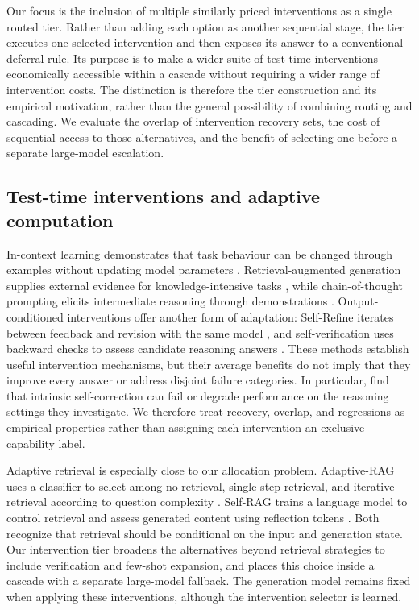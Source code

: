 \documentclass[sigconf]{acmart}
\begin{document}
Our focus is the inclusion of multiple similarly priced interventions as a single routed tier. Rather than adding each option as another sequential stage, the tier executes one selected intervention and then exposes its answer to a conventional deferral rule. Its purpose is to make a wider suite of test-time interventions economically accessible within a cascade without requiring a wider range of intervention costs. The distinction is therefore the tier construction and its empirical motivation, rather than the general possibility of combining routing and cascading. We evaluate the overlap of intervention recovery sets, the cost of sequential access to those alternatives, and the benefit of selecting one before a separate large-model escalation.

\subsection{Test-time interventions and adaptive computation}

In-context learning demonstrates that task behaviour can be changed through examples without updating model parameters \cite{icl}. Retrieval-augmented generation supplies external evidence for knowledge-intensive tasks \cite{NEURIPS2020_6b493230}, while chain-of-thought prompting elicits intermediate reasoning through demonstrations \cite{wei2022chain}. Output-conditioned interventions offer another form of adaptation: Self-Refine iterates between feedback and revision with the same model \cite{selfrefine}, and self-verification uses backward checks to assess candidate reasoning answers \cite{selfverify}. These methods establish useful intervention mechanisms, but their average benefits do not imply that they improve every answer or address disjoint failure categories. In particular, \citet{huang2024selfcorrect} find that intrinsic self-correction can fail or degrade performance on the reasoning settings they investigate. We therefore treat recovery, overlap, and regressions as empirical properties rather than assigning each intervention an exclusive capability label.

Adaptive retrieval is especially close to our allocation problem. Adaptive-RAG uses a classifier to select among no retrieval, single-step retrieval, and iterative retrieval according to question complexity \cite{jeong2024adaptiverag}. Self-RAG trains a language model to control retrieval and assess generated content using reflection tokens \cite{asai2024selfrag}. Both recognize that retrieval should be conditional on the input and generation state. Our intervention tier broadens the alternatives beyond retrieval strategies to include verification and few-shot expansion, and places this choice inside a cascade with a separate large-model fallback. The generation model remains fixed when applying these interventions, although the intervention selector is learned.
\end{document}

